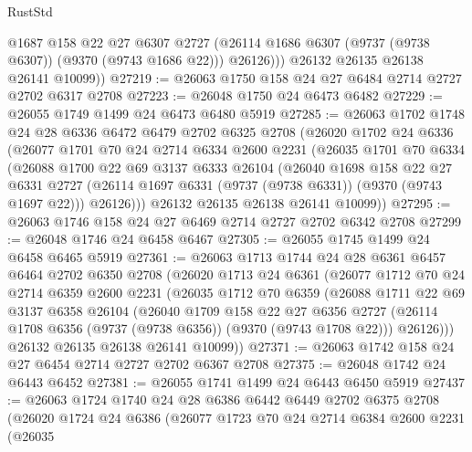 \begin{lexlean}{RustStd}
\begin{coremodule}
              @1687
              @158
              @22
              @27
              @6307
              @2727
              (@26114 @1686 @6307 (@9737 (@9738 @6307)) (@9370 (@9743 @1686 @22)))
              @26126)))
        @26132
        @26135
        @26138
        @26141
        @10099))
@27219 := @26063 @1750 @158 @24 @27 @6484 @2714 @2727 @2702 @6317 @2708
@27223 := @26048 @1750 @24 @6473 @6482
@27229 := @26055 @1749 @1499 @24 @6473 @6480 @5919
@27285 := @26063
    @1702
    @1748
    @24
    @28
    @6336
    @6472
    @6479
    @2702
    @6325
    @2708
    (@26020
      @1702
      @24
      @6336
      (@26077
        @1701
        @70
        @24
        @2714
        @6334
        @2600
        @2231
        (@26035
          @1701
          @70
          @6334
          (@26088
            @1700
            @22
            @69
            @3137
            @6333
            @26104
            (@26040
              @1698
              @158
              @22
              @27
              @6331
              @2727
              (@26114 @1697 @6331 (@9737 (@9738 @6331)) (@9370 (@9743 @1697 @22)))
              @26126)))
        @26132
        @26135
        @26138
        @26141
        @10099))
@27295 := @26063 @1746 @158 @24 @27 @6469 @2714 @2727 @2702 @6342 @2708
@27299 := @26048 @1746 @24 @6458 @6467
@27305 := @26055 @1745 @1499 @24 @6458 @6465 @5919
@27361 := @26063
    @1713
    @1744
    @24
    @28
    @6361
    @6457
    @6464
    @2702
    @6350
    @2708
    (@26020
      @1713
      @24
      @6361
      (@26077
        @1712
        @70
        @24
        @2714
        @6359
        @2600
        @2231
        (@26035
          @1712
          @70
          @6359
          (@26088
            @1711
            @22
            @69
            @3137
            @6358
            @26104
            (@26040
              @1709
              @158
              @22
              @27
              @6356
              @2727
              (@26114 @1708 @6356 (@9737 (@9738 @6356)) (@9370 (@9743 @1708 @22)))
              @26126)))
        @26132
        @26135
        @26138
        @26141
        @10099))
@27371 := @26063 @1742 @158 @24 @27 @6454 @2714 @2727 @2702 @6367 @2708
@27375 := @26048 @1742 @24 @6443 @6452
@27381 := @26055 @1741 @1499 @24 @6443 @6450 @5919
@27437 := @26063
    @1724
    @1740
    @24
    @28
    @6386
    @6442
    @6449
    @2702
    @6375
    @2708
    (@26020
      @1724
      @24
      @6386
      (@26077
        @1723
        @70
        @24
        @2714
        @6384
        @2600
        @2231
        (@26035

\end{coremodule}
\end{lexlean}
